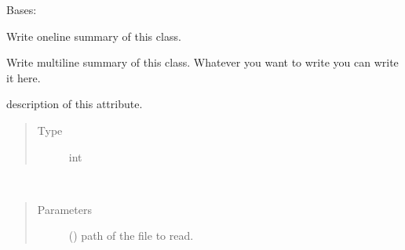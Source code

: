 \documentclass[letterpaper,10pt,english]{sphinxmanual}
\begin{document}
\begin{fulllineitems}
\label{\detokenize{doku:doku.data_builder.BaseDataBuilder}}
\sphinxAtStartPar
Bases: 

\sphinxAtStartPar
Write one\sphinxhyphen{}line summary of this class.

\sphinxAtStartPar
Write multi\sphinxhyphen{}line summary of this class. Whatever you want to write you
can write it here.

\begin{fulllineitems}
\label{\detokenize{doku:doku.data_builder.BaseDataBuilder.att_a}}
\sphinxAtStartPar
description of this attribute.
\begin{quote}\begin{description}
\item[{Type}] \leavevmode
\sphinxAtStartPar
int

\end{description}\end{quote}

\end{fulllineitems}


\begin{fulllineitems}
\label{\detokenize{doku:doku.data_builder.BaseDataBuilder.method_a}}~\begin{quote}\begin{description}
\item[{Parameters}] \leavevmode
\sphinxAtStartPar
{} () \textendash{} path of the file to read.

\end{description}\end{quote}

\end{fulllineitems}


\end{fulllineitems}
\end{document}
